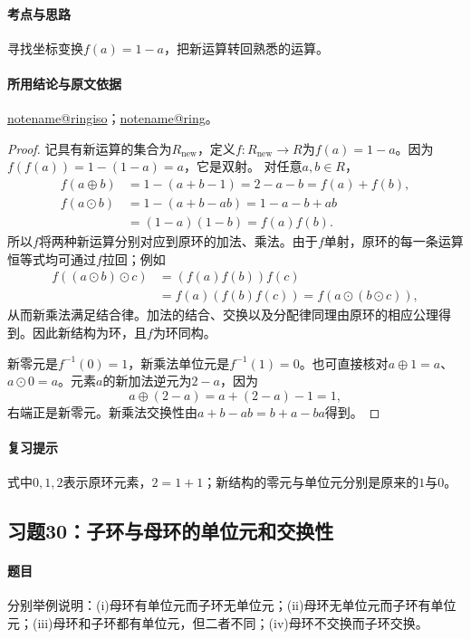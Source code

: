 \documentclass[UTF8,a4paper,11pt,fontset=windows]{ctexart}
\makeatletter
\newcommand{\noteref}[1]{\hyperref[note:#1]{\csname notename@#1\endcsname}}
\newcommand{\exref}[2]{\hyperref[ex:#1:#2]{第#1章习题#2}}
\makeatother
\begin{document}
\paragraph{考点与思路}
寻找坐标变换$f(a)=1-a$，把新运算转回熟悉的运算。

\paragraph{所用结论与原文依据}
\noteref{ringiso}；\noteref{ring}。


\begin{proof}
记具有新运算的集合为$R_{\mathrm{new}}$，定义$f:R_{\mathrm{new}}\to R$为$f(a)=1-a$。因为$f(f(a))=1-(1-a)=a$，它是双射。
对任意$a,b\in R$，
\begin{align*}
f(a\oplus b)&=1-(a+b-1)=2-a-b=f(a)+f(b),\\
f(a\odot b)&=1-(a+b-ab)=1-a-b+ab\\
&=(1-a)(1-b)=f(a)f(b).
\end{align*}
所以$f$将两种新运算分别对应到原环的加法、乘法。由于$f$单射，原环的每一条运算恒等式均可通过$f$拉回；例如
\begin{align*}
f((a\odot b)\odot c)&=(f(a)f(b))f(c)\\
&=f(a)(f(b)f(c))=f(a\odot(b\odot c)),
\end{align*}
从而新乘法满足结合律。加法的结合、交换以及分配律同理由原环的相应公理得到。因此新结构为环，且$f$为环同构。

新零元是$f^{-1}(0)=1$，新乘法单位元是$f^{-1}(1)=0$。也可直接核对$a\oplus1=a$、$a\odot0=a$。元素$a$的新加法逆元为$2-a$，因为
\[
a\oplus(2-a)=a+(2-a)-1=1,
\]
右端正是新零元。新乘法交换性由$a+b-ab=b+a-ba$得到。
\end{proof}

\paragraph{复习提示}
式中$0,1,2$表示原环元素，$2=1+1$；新结构的零元与单位元分别是原来的$1$与$0$。


\subsection{习题30：\texorpdfstring{子环与母环的单位元和交换性}{子环与母环的单位元和交换性}}
\label{ex:1:30}

\paragraph{题目}
分别举例说明：(i)母环有单位元而子环无单位元；(ii)母环无单位元而子环有单位元；(iii)母环和子环都有单位元，但二者不同；(iv)母环不交换而子环交换。
\end{document}
